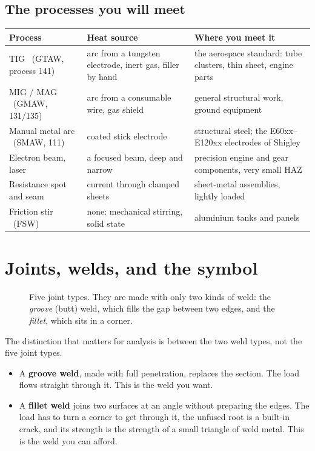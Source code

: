\documentclass[11pt,a4paper]{article}
\begin{document}
\subsection*{The processes you will meet}

\begin{center}\footnotesize
\begin{tabular}{@{}p{3.6cm}p{5.2cm}p{6.2cm}@{}}
\toprule
\textbf{Process} & \textbf{Heat source} & \textbf{Where you meet it}\\
\midrule
TIG \ (GTAW, process 141) & arc from a tungsten electrode, inert gas, filler by hand &
  the aerospace standard: tube clusters, thin sheet, engine parts\\[2pt]
MIG / MAG \ (GMAW, 131/135) & arc from a consumable wire, gas shield & general structural work,
  ground equipment\\[2pt]
Manual metal arc \ (SMAW, 111) & coated stick electrode & structural steel; the E60xx--E120xx
  electrodes of Shigley\\[2pt]
Electron beam, laser & a focused beam, deep and narrow & precision engine and gear components,
  very small HAZ\\[2pt]
Resistance spot and seam & current through clamped sheets & sheet-metal assemblies, lightly
  loaded\\[2pt]
Friction stir \ (FSW) & none: mechanical stirring, solid state & aluminium tanks and panels\\
\bottomrule
\end{tabular}
\end{center}

\section{Joints, welds, and the symbol}

\begin{figure}[H]\centering
\resizebox{0.9\textwidth}{!}{}
\caption{Five joint types. They are made with only two kinds of weld: the \emph{groove} (butt)
weld, which fills the gap between two edges, and the \emph{fillet}, which sits in a corner.}
\label{fig:types}
\end{figure}

The distinction that matters for analysis is between the two weld types, not the five joint types.

\begin{itemize}[leftmargin=*,itemsep=2pt]
\item A \textbf{groove weld}, made with full penetration, replaces the section. The load flows
  straight through it. This is the weld you want.
\item A \textbf{fillet weld} joins two surfaces at an angle without preparing the edges. The load
  has to turn a corner to get through it, the unfused root is a built-in crack, and its strength
  is the strength of a small triangle of weld metal. This is the weld you can afford.
\end{itemize}
\end{document}
